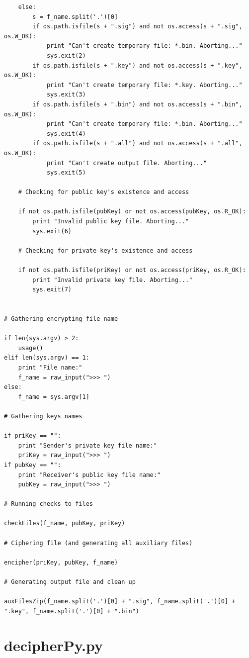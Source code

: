 \documentclass[a4paper,11pt,openright,oneside]{report}
\begin{document}
\begin{verbatim}
    else:
        s = f_name.split('.')[0]
        if os.path.isfile(s + ".sig") and not os.access(s + ".sig", os.W_OK):
            print "Can't create temporary file: *.bin. Aborting..."
            sys.exit(2)
        if os.path.isfile(s + ".key") and not os.access(s + ".key", os.W_OK):
            print "Can't create temporary file: *.key. Aborting..."
            sys.exit(3)
        if os.path.isfile(s + ".bin") and not os.access(s + ".bin", os.W_OK):
            print "Can't create temporary file: *.bin. Aborting..."
            sys.exit(4)
        if os.path.isfile(s + ".all") and not os.access(s + ".all", os.W_OK):
            print "Can't create output file. Aborting..."
            sys.exit(5)

    # Checking for public key's existence and access

    if not os.path.isfile(pubKey) or not os.access(pubKey, os.R_OK):
        print "Invalid public key file. Aborting..."
        sys.exit(6)

    # Checking for private key's existence and access

    if not os.path.isfile(priKey) or not os.access(priKey, os.R_OK):
        print "Invalid private key file. Aborting..."
        sys.exit(7)


# Gathering encrypting file name

if len(sys.argv) > 2:
    usage()
elif len(sys.argv) == 1:
    print "File name:"
    f_name = raw_input(">>> ")
else:
    f_name = sys.argv[1]

# Gathering keys names

if priKey == "":
    print "Sender's private key file name:"
    priKey = raw_input(">>> ")
if pubKey == "":
    print "Receiver's public key file name:"
    pubKey = raw_input(">>> ")

# Running checks to files

checkFiles(f_name, pubKey, priKey)

# Ciphering file (and generating all auxiliary files)

encipher(priKey, pubKey, f_name)

# Generating output file and clean up

auxFilesZip(f_name.split('.')[0] + ".sig", f_name.split('.')[0] + ".key", f_name.split('.')[0] + ".bin")
\end{verbatim}

\newpage
\section{decipherPy.py}
\label{App:decipher.py}
\end{document}
